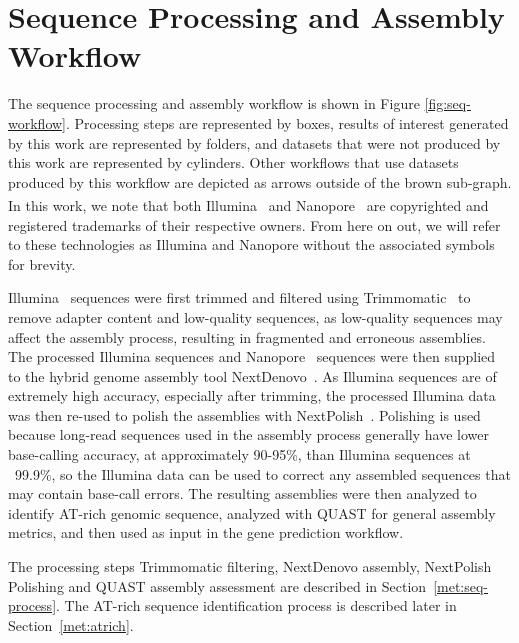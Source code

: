 \section{Sequence Processing and Assembly Workflow}
\label{met:seq-workflow}

The sequence processing and assembly workflow is shown in Figure
\ref{fig:seq-workflow}. Processing steps are represented by boxes,
results of interest generated by this work are represented by folders,
and datasets that were not produced by this work are represented by
cylinders. Other workflows that use datasets produced by this workflow
are depicted as arrows outside of the brown sub-graph. In this work, we note that both Illumina~\textsuperscript{\textcopyright\textregistered} and Nanopore~\textsuperscript{\textcopyright\textregistered} are copyrighted and registered trademarks of their respective owners. From here on out, we will refer to these technologies as Illumina and Nanopore without the associated symbols for brevity.

Illumina~\cite{bennett2004a} sequences were first trimmed and filtered using Trimmomatic~\cite{bolger2014a} to remove adapter content and low-quality sequences, as low-quality sequences may affect the assembly process, resulting in fragmented and erroneous assemblies. The processed Illumina sequences and Nanopore~\cite{wang2021a} sequences were then supplied to the hybrid genome assembly tool NextDenovo~\cite{hu2024a}. As Illumina sequences are of extremely high accuracy, especially after trimming, the processed Illumina data was then re-used to polish the assemblies with NextPolish~\cite{hu2020a}. Polishing is used because long-read sequences used in the assembly process generally have lower base-calling accuracy, at approximately 90-95\%, than Illumina sequences at ~99.9\%, so the Illumina data can be used to correct any assembled sequences that may contain base-call errors. The resulting assemblies were then analyzed to identify AT-rich genomic sequence, analyzed with QUAST for general assembly metrics, and then used as input in the gene prediction workflow.

The processing steps Trimmomatic filtering, NextDenovo assembly,
NextPolish Polishing and QUAST assembly assessment are described in
Section~\ref{met:seq-process}. The AT-rich sequence identification
process is described later in Section~\ref{met:atrich}.

